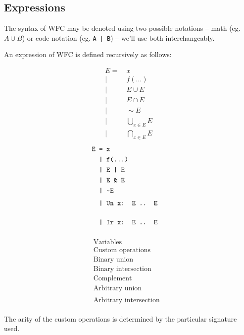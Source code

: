 \documentclass[oneside,12pt]{book}
\theoremstyle{definition}
\theoremstyle{remark}
\newcommand{\tde}{\raisebox{0.5ex}{\texttildelow}}
\newcommand{\ct}{{\sim}} %
\begin{document}
\subsection{Expressions}
The syntax of WFC may be denoted using two possible notations -- math
(eg. $A \cup B$) or code notation (eg. \texttt{A | B}) -- we'll use both
interchangeably.

An expression of WFC is defined recursively as follows:

\noindent
\begin{minipage}{\linewidth}
\noindent
\begin{multicols*}{3}
  \noindent
  \begin{align*}
    E =&~x \\
     |&~f(...) \\
     |&~E \cup E \\
     |&~E \cap E \\
     |&~\ct E \\
     |&~\bigcup_{x \in E}E \\
     |&~\bigcap_{x \in E}E
  \end{align*}
  \begin{align*}
      \texttt{E =}&\texttt{ x} \\
      \texttt{|}&\texttt{ f(...)} \\
      \texttt{|}&\texttt{ E | E} \\
      \texttt{|}&\texttt{ E \& E} \\
      \texttt{|}&\texttt{ \tde E} \\
      \texttt{|}&\texttt{ Un x: E .. E} \phantom{\bigcup_E} \\
      \texttt{|}&\texttt{ Ir x: E .. E} \phantom{\bigcup_E}
  \end{align*}
  \begin{align*}
    &\text{Variables} \\
    &\text{Custom operations} \\
    &\text{Binary union} \\
    &\text{Binary intersection} \\
    &\text{Complement} \\
    &\text{Arbitrary union} \phantom{\bigcup_E} \\
    &\text{Arbitrary intersection} \phantom{\bigcup_E}
  \end{align*}
\end{multicols*}
\end{minipage}

\medskip \noindent
The arity of the custom operations is determined by the particular signature used.
\end{document}

